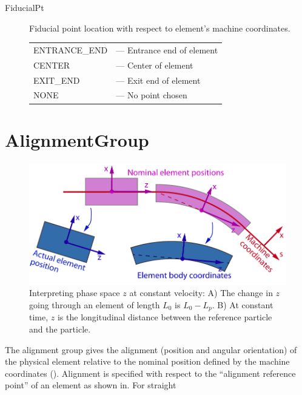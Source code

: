 \begin{description}
\begin{tabular}{ll}
\end{tabular}
%
\item[FiducialPt] Fiducial point location with respect to element's machine coordinates. \Newline
\hspace*{-20pt}
\begin{tabular}{ll}
  ENTRANCE_END & --- Entrance end of element \\
  CENTER       & --- Center of element \\
  EXIT_END     & --- Exit end of element \\
  NONE         & --- No point chosen \\
\end{tabular}
%
\end{description}

\section{AlignmentGroup}
\label{s:align.g}

\begin{figure}
\centering \includegraphics{alignment-ref.pdf} \caption[Element alignment]  
{Interpreting phase space $z$ at constant velocity: A) The change in $z$ going through
an element of length $L_0$ is $L_0 - L_p$.  B) At constant time, $z$ is the longitudinal distance
between the reference particle and the particle.}  \label{f:alignment}
\end{figure}


The alignment group gives the alignment (position and angular orientation) of the physical element 
relative to the nominal position defined by the machine coordinates ().
Alignment is specified with respect to the ``alignment reference point'' of an element as shown
in. For straight 



